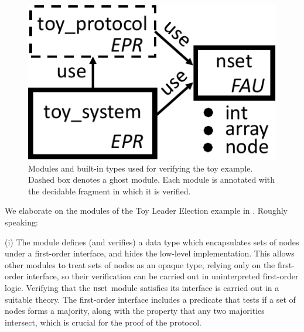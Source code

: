 

\begin{figure}
\caption{Modules and built-in types used for verifying the toy example. Dashed box denotes a ghost module.
Each module is annotated with the decidable fragment in which it is verified. \label{fig:modules}}
    \includegraphics[scale=0.6]{modules-fig-trim}
\end{figure}

We elaborate on the modules of the Toy Leader Election example in .
Roughly speaking:

(i) The {\mnodeset} module defines (and verifies) a data type which encapsulates sets of nodes under a first-order interface,
and hides the low-level implementation.
This allows other modules to treat sets of nodes as an opaque type, relying only on the first-order interface, so their verification can be carried out in uninterpreted first-order logic.
Verifying that the ${\text{nset}}$ module satisfies its interface is carried out in a suitable theory.
The first-order interface includes a predicate that tests if a set of nodes forms a majority,
along with the property that any two majorities intersect, which is crucial for the proof of the protocol.

